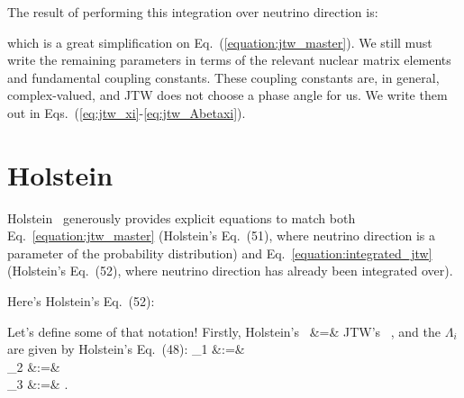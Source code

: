 The result of performing this integration over neutrino direction is:

which is a great simplification on Eq.~(\ref{equation:jtw_master}).  We still must write the remaining parameters in terms of the relevant nuclear matrix elements and fundamental coupling constants.  These coupling constants are, in general, complex-valued, and JTW does not choose a phase angle for us.  We write them out in 
Eqs.~(\ref{eq:jtw_xi}-\ref{eq:jtw_Abetaxi}).




\section[Holstein]{Holstein} 
Holstein~\cite{holstein} generously provides explicit equations to match both Eq.~\ref{equation:jtw_master} (Holstein's Eq.~(51), where neutrino direction is a parameter of the probability distribution) and Eq.~\ref{equation:integrated_jtw} (Holstein's Eq.~(52), where neutrino direction has already been integrated over).  



Here's Holstein's Eq.~(52):





Let's define some of that notation!
Firstly, 
\bea
\textrm{Holstein's \,} \hatn &=& \textrm{JTW's \,} \hatj,
\label{eq:nequalsj}
\eea
and the 
$\Lambda_i$ are given by Holstein's Eq.~(48):
\bea
    \Lambda_1   &:=& \LambdaOne   
    \label{eq:lambda1} \\
    \Lambda_2   &:=& \LambdaTwo 
    \label{eq:lambda2} \\
    \Lambda_3   &:=& \LambdaThree .
    \label{eq:lambda3}
\eea

